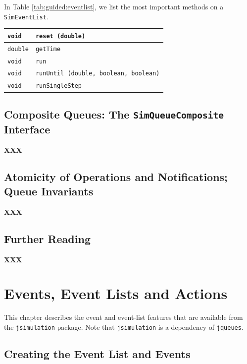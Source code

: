 \documentclass[12pt]{book}
\begin{document}
In Table \ref{tab:guided:eventlist},
  we list the most important methods
  on a \lstinline|SimEventList|.

\begin{table}[h]
\label{tab:guided:eventlist}
\caption{Important methods on a \texttt{SimEventList}.}
\begin{longtabu}{|l|l|}
\hline
\lstinline|void|   & \lstinline|reset (double)|
  \\ \hline
\lstinline|double| & \lstinline|getTime|
  \\ \hline
\lstinline|void|   & \lstinline|run|
  \\ \hline
\lstinline|void|   & \lstinline|runUntil (double, boolean, boolean)|
  \\ \hline
\lstinline|void|   & \lstinline|runSingleStep|
  \\ \hline
\end{longtabu}
\end{table}

\section{Composite Queues: The \texttt{SimQueueComposite} Interface}
\label{sec:guided:simqueue-composite}

{\bf XXX}

\section{Atomicity of Operations and Notifications; Queue Invariants}
\label{sec:guided:atomicity}

{\bf XXX}

\section{Further Reading}
\label{sec:guided:further-reading}

{\bf XXX}

\chapter{Events, Event Lists and Actions}
\label{sec:events-eventlists-actions}

This chapter describes the event and event-list features
  that are available from the \lstinline{jsimulation} package.
Note that \lstinline{jsimulation} is a dependency of \lstinline{jqueues}.

\section{Creating the Event List and Events}
\end{document}
